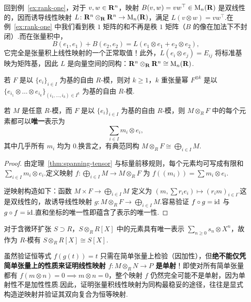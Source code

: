 \begin{example}\label{ex:mat-tensor}
回到例~\ref{ex:rank-one}，对于 $v, w \in \mathbf{R}^n$，映射 $B(v, w) = vw^\top \in \mathrm{M}_n(\mathbf{R})$ 是双线性的，因而诱导线性映射 $L \colon \mathbf{R}^n \otimes_{\mathbf{R}} \mathbf{R}^n \to \mathrm{M}_n(\mathbf{R})$，满足 $L(v \otimes w) = vw^\top$.在例~\ref{ex:rank-one} 中我们看到秩 $1$ 矩阵的和不再是秩 $1$ 矩阵（$B$ 的像在加法下不封闭）.而在张量积中，
\[
  B(e_1, e_1) + B(e_2, e_2) = L(e_1 \otimes e_1 + e_2 \otimes e_2),
\]
它完全是张量积上线性映射的一个正常取值！此外，$L(e_i \otimes e_j) = E_{ij}$ 将标准基映为矩阵基，因此 $L$ 是向量空间的同构：$\mathbf{R}^n \otimes_{\mathbf{R}} \mathbf{R}^n \cong \mathrm{M}_n(\mathbf{R})$.
\end{example}

\begin{theorem}\label{thm:free-power}
若 $F$ 是以 $\{e_i\}_{i \in I}$ 为基的自由 $R$-模，则对 $k \geq 1$，$k$ 重张量幂 $F^{\otimes k}$ 是以 $\{e_{i_1} \otimes \dots \otimes e_{i_k}\}_{(i_1, \dots, i_k) \in I^k}$ 为基的自由 $R$-模.
\end{theorem}

\begin{theorem}\label{thm:m-tensor-free}
若 $M$ 是任意 $R$-模，而 $F$ 是以 $\{e_i\}_{i \in I}$ 为基的自由 $R$-模，则 $M \otimes_R F$ 中的每个元素都可以\textbf{唯一}表示为
\[
  \sum_{i \in I} m_i \otimes e_i,
\]
其中几乎所有 $m_i$ 均为 $0$.换言之，有典范同构 $M \otimes_R F \cong \bigoplus_{i \in I} M$.
\end{theorem}

\begin{proof}
由定理~\ref{thm:spanning-tensor} 与标量前移规则，每个元素均可写成有限和 $\sum_{i \in I} m_i \otimes e_i$.定义映射 $f \colon \bigoplus_{i \in I} M \to M \otimes_R F$ 为 $f((m_i)) = \sum m_i \otimes e_i$.

逆映射构造如下：函数 $M \times F \to \bigoplus_{i \in I} M$ 定义为 $(m, \sum r_i e_i) \mapsto (r_i m)_{i \in I}$.这是双线性的，故诱导线性映射 $g \colon M \otimes_R F \to \bigoplus_{i \in I} M$.容易验证 $f \circ g = \operatorname{id}$ 与 $g \circ f = \operatorname{id}$.直和坐标的唯一性即蕴含了表示的唯一性.
\end{proof}

\begin{example}\label{ex:s-tensor-poly}
对于含微环扩张 $S \supset R$，$S \otimes_R R[X]$ 中的元素具有唯一表示 $\sum_{n \geq 0} s_n \otimes X^n$，故作为 $R$-模有 $S \otimes_R R[X] \cong S[X]$.
\end{example}

\begin{remark}\label{rem:injectivity-caution}
虽然验证恒等式 $f(g(t)) = t$ 只需在简单张量上检验（因加性），但\textbf{绝不能仅凭简单张量上的性质来证明线性映射 $f \colon M \otimes_R N \to P$ 是单射}！即使对所有简单张量都有 $f(m \otimes n) = 0 \implies m \otimes n = 0$，整个映射 $f$ 仍然完全可能不是单射，因为单射性不是加性性质.因此，证明张量积线性映射为同构最稳妥的途径，往往是显式构造逆映射并验证其双向复合为恒等映射.
\end{remark}

